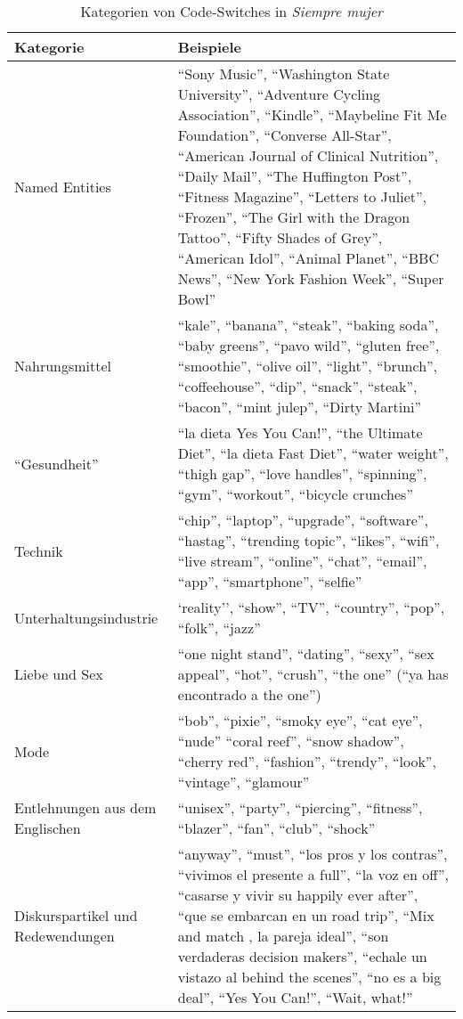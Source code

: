 \begin{table*}[h!]
  \centering
    \begin{tabular}{l p{9cm} }
        Kategorie & Beispiele \\
    \hline
        Named Entities & ``Sony Music'', ``Washington State University'', ``Adventure Cycling Association'', ``Kindle'', ``Maybeline Fit Me Foundation'', ``Converse All-Star'',  ``American Journal of Clinical Nutrition'', ``Daily Mail'', ``The Huffington Post'', ``Fitness Magazine'', ``Letters to Juliet'', ``Frozen'', ``The Girl with the Dragon Tattoo'', ``Fifty Shades of Grey'', ``American Idol'', ``Animal Planet'', ``BBC News'', ``New York Fashion Week'', ``Super Bowl''\\
    \hline
        Nahrungsmittel & ``kale'', ``banana'', ``steak'', ``baking soda'', ``baby greens'', ``pavo wild'', ``gluten free'', ``smoothie'', ``olive oil'', ``light'', ``brunch'', ``coffeehouse'', ``dip'', ``snack'', ``steak'', ``bacon'', ``mint julep'', ``Dirty Martini''\\
    \hline
        ``Gesundheit'' & ``la dieta Yes You Can!'', ``the Ultimate Diet'', ``la dieta Fast Diet'', ``water weight'', ``thigh gap'', ``love handles'', ``spinning'', ``gym'', ``workout'', ``bicycle crunches''\\
    \hline
        Technik & ``chip'', ``laptop'', ``upgrade'', ``software'', ``hastag'', ``trending topic'', ``likes'', ``wifi'', ``live stream'', ``online'', ``chat'', ``email'', ``app'', ``smartphone'', ``selfie''\\
    \hline
        Unterhaltungsindustrie & `reality'', ``show'', ``TV'', ``country'', ``pop'', ``folk'', ``jazz''\\
    \hline
        Liebe und Sex & ``one night stand'', ``dating'', ``sexy'', ``sex appeal'', ``hot'', ``crush'', ``the one'' (``ya has encontrado a the one'')\\
    \hline
        Mode & ``bob'', ``pixie'', ``smoky eye'', ``cat eye'', ``nude'' ``coral reef'', ``snow shadow'', ``cherry red'', ``fashion'', ``trendy'', ``look'', ``vintage'', ``glamour''\\
    \hline
        Entlehnungen aus dem Englischen & ``unisex'', ``party'', ``piercing'', ``fitness'', ``blazer'', ``fan'', ``club'', ``shock'' \\
    \hline
        Diskurspartikel und Redewendungen & ``anyway'', ``must'', ``los pros y los contras'', ``vivimos el presente a full'', ``la voz en off'', ``casarse y vivir su happily ever after'', ``que se embarcan en un road trip'', ``Mix and match , la pareja ideal'', ``son verdaderas decision makers'', ``echale un vistazo al behind the scenes'', ``no es a big deal'', ``Yes You Can!'', ``Wait, what!''\\
  \end{tabular}
    \caption{Kategorien von Code-Switches in \emph{Siempre mujer}}~\label{tab:code-switch-cathegories}
\end{table*}

